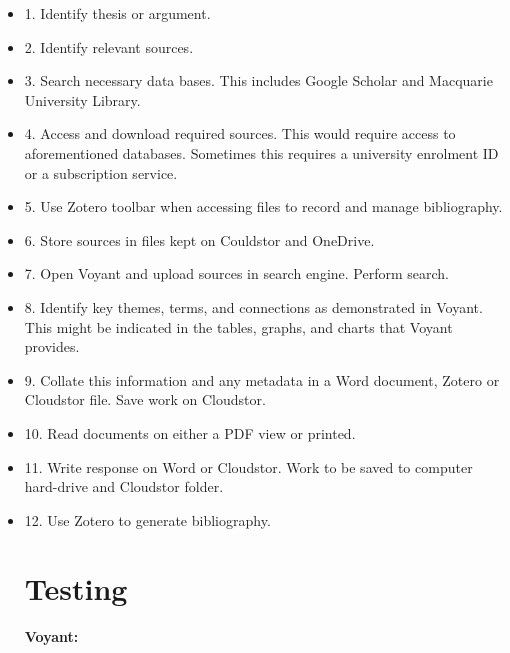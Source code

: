\documentclass[a4paper,12pt]{article}
\begin{document}
\begin{itemize} 

\item 1.	Identify thesis or argument. 
\item 2.	Identify relevant sources. 
\item 3.	Search necessary data bases. This includes Google Scholar and Macquarie University Library. 
\item 4.	Access and download required sources. This would require access to aforementioned databases. Sometimes this requires a university enrolment ID or a subscription service. 
\item 5.	Use Zotero toolbar when accessing files to record and manage bibliography.
\item 6.	Store sources in files kept on Couldstor and OneDrive. 
\item 7.	Open Voyant and upload sources in search engine. Perform search. 
\item 8.	Identify key themes, terms, and connections as demonstrated in Voyant. This might be indicated in the tables, graphs, and charts that Voyant provides. 
\item 9.	Collate this information and any metadata in a Word document, Zotero or Cloudstor file. Save work on Cloudstor. 
\item 10.	Read documents on either a PDF view or printed.
\item 11.	Write response on Word or Cloudstor. Work to be saved to computer hard-drive and Cloudstor folder. 
\item 12.	Use Zotero to generate bibliography. 

\section {Testing}

\textbf {Voyant:}


\end{itemize}
\end{document}
